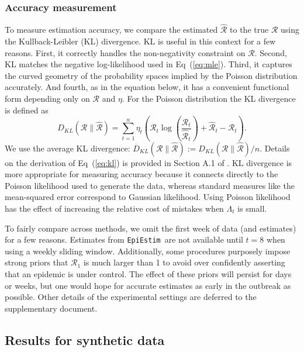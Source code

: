 \documentclass[10pt,letterpaper]{article}
\newcommand{\lr}[1]{\left(#1\right)}
\def\EpiEstim{\texttt{EpiEstim}}
\def\calR{\mathcal{R}}
\renewcommand{\eqref}[1]{Eq~(\ref{#1})}
\begin{document}
\subsubsection{Accuracy measurement}

To measure estimation accuracy, we compare the estimated $\widehat{\calR}$ to
the true $\calR$ using the Kullback-Leibler (KL) divergence. KL is useful in
this context for a few reasons. First, it correctly handles the non-negativity
constraint on $\calR$. Second, KL matches the negative log-likelihood used in
\eqref{eq:mle}. Third, it captures the curved geometry of the probability spaces
implied by the Poisson distribution accurately. And fourth, as in the equation
below, it has a convenient functional form depending only on $\calR$ and $\eta$.
For the Poisson distribution the KL divergence is defined as
\begin{equation} \label{eq:kl}
  D_{KL}(\calR \parallel \widehat{\calR}) = \sum_{t=1}^n \eta_t \lr{\calR_t
  \log\left(\frac{\calR_t} {\widehat{\calR}_t}\right) + \widehat{\calR}_t -
{\calR}_t}.
\end{equation}
We use the average KL divergence: $\overline{D}_{KL}(\calR \parallel
\widehat{\calR}) := D_{KL}(\calR \parallel \widehat{\calR}) / n$. Details on the
derivation of \eqref{eq:kl} is provided in Section A.1 of . KL
divergence is more appropriate for measuring accuracy because it connects
directly to the Poisson likelihood used to generate the data, whereas standard
measures like the mean-squared error correspond to Gaussian likelihood. Using
Poisson likelihood has the effect of increasing the relative cost of mistakes
when $\Lambda_t$ is small. 

To fairly compare across methods, we omit the first week of data (and estimates)
for a few reasons. Estimates from \EpiEstim\ are not available until $t=8$ when
using a weekly sliding window. Additionally, some procedures purposely impose
strong priors that $\calR_1$ is much larger than 1 to avoid over confidently
asserting that an epidemic is under control. The effect of these priors will
persist for days or weeks, but one would hope for accurate estimates as early in
the outbreak as possible. Other details of the experimental settings are
deferred to the supplementary document. 



\subsection{Results for synthetic data}
\end{document}
